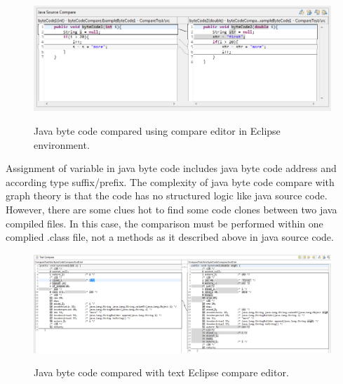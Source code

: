 \documentclass{report}
\begin{document}
\begin{figure}[h]
  \centering
  \includegraphics[scale = 0.55]{Figures/bytecode-compare/example-of-bytecode-text-compared}\\[0.1cm]
  \caption[Java byte code compared in Eclipse text compare editor]{Java byte code compared using compare editor in Eclipse environment.}
  \label{fig:example-of-bytecode-text-compared}
\end{figure}

Assignment of variable in java byte code includes java byte code address and according type suffix/prefix. The complexity of java byte code compare with graph theory is that the code has no structured logic like java source code. However, there are some clues hot to find some code clones between two java compiled files. In this case, the comparison must be performed within one complied .class file, not a methods as it described above in java source code.

\begin{figure}[h]
  \centering
  \includegraphics[scale = 0.4]{Figures/bytecode-compare/example-of-bytecode-original-compared}\\[0.1cm]
  \caption[Java byte code compared with text Eclipse compare editor]{Java byte code compared with text Eclipse compare editor.}
  \label{fig:example-of-bytecode-original-compared}
\end{figure}
\end{document}
